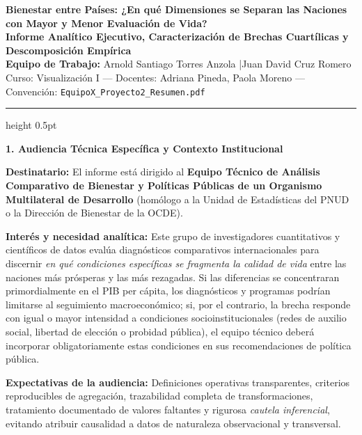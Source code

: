 \documentclass[9pt,a4paper]{article}
\newcommand{\customsection}[1]{%
  \vspace{0.2em}%
  {\small\bfseries\color{whrmagenta}#1}%
  \vspace{0.05em}\par%
}
\begin{document}

\begin{center}
    {\normalsize\bfseries\color{darkslate} Bienestar entre Países: ¿En qué Dimensiones se Separan las Naciones con Mayor y Menor Evaluación de Vida?}\\[0.15em]
    {\scriptsize\textcolor{whrmagenta}{\textbf{Informe Analítico Ejecutivo, Caracterización de Brechas Cuartílicas y Descomposición Empírica}}}\\[0.2em]
    {\scriptsize\textbf{Equipo de Trabajo:} Arnold Santiago Torres Anzola \quad|\quad Juan David Cruz Romero}\\[0.08em]
    {\tiny\textcolor{softslate}{Curso: Visualización I --- Docentes: Adriana Pineda, Paola Moreno --- Convención: \texttt{EquipoX\_Proyecto2\_Resumen.pdf}}}
\end{center}

\vspace{-0.4em}
\hrule height 0.5pt
\vspace{0.15em}

\customsection{1. Audiencia Técnica Específica y Contexto Institucional}
\textbf{Destinatario:} El informe está dirigido al \textbf{Equipo Técnico de Análisis Comparativo de Bienestar y Políticas Públicas de un Organismo Multilateral de Desarrollo} (homólogo a la Unidad de Estadísticas del PNUD o la Dirección de Bienestar de la OCDE).

\textbf{Interés y necesidad analítica:} Este grupo de investigadores cuantitativos y científicos de datos evalúa diagnósticos comparativos internacionales para discernir \textit{en qué condiciones específicas se fragmenta la calidad de vida} entre las naciones más prósperas y las más rezagadas. Si las diferencias se concentraran primordialmente en el PIB per cápita, los diagnósticos y programas podrían limitarse al seguimiento macroeconómico; si, por el contrario, la brecha responde con igual o mayor intensidad a condiciones socioinstitucionales (redes de auxilio social, libertad de elección o probidad pública), el equipo técnico deberá incorporar obligatoriamente estas condiciones en sus recomendaciones de política pública.

\textbf{Expectativas de la audiencia:} Definiciones operativas transparentes, criterios reproducibles de agregación, trazabilidad completa de transformaciones, tratamiento documentado de valores faltantes y rigurosa \textit{cautela inferencial}, evitando atribuir causalidad a datos de naturaleza observacional y transversal.
\end{document}
